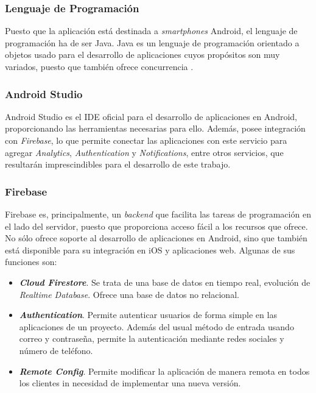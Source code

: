\subsubsection*{Lenguaje de Programación}
Puesto que la aplicación está destinada a \textit{smartphones} Android, el lenguaje de programación ha de ser Java. Java es un lenguaje de programación orientado a objetos usado para el desarrollo de aplicaciones cuyos propósitos son muy variados, puesto que también ofrece concurrencia \cite{Java}.

\subsubsection*{Android Studio}
Android Studio \cite{AndroidStudio} es el \acs{IDE} oficial para el desarrollo de aplicaciones en Android, proporcionando las herramientas necesarias para ello. Además, posee integración con \textit{Firebase}, lo que permite conectar las aplicaciones con este servicio para agregar \textit{Analytics}, \textit{Authentication} y \textit{Notifications}, entre otros servicios, que resultarán imprescindibles para el desarrollo de este trabajo.

\newpage

\subsubsection*{Firebase}
Firebase \cite{GooFirebase} es, principalmente, un \textit{backend} que facilita las tareas de programación en el lado del servidor, puesto que proporciona acceso fácil a los recursos que ofrece. No sólo ofrece soporte al desarrollo de aplicaciones en Android, sino que también está disponible para su integración en iOS y aplicaciones web. Algunas de sus funciones son:

\begin{itemize}
	\item \textbf{\textit{Cloud Firestore}}. Se trata de una base de datos en tiempo real, evolución de \textit{Realtime Database}. Ofrece una base de datos no relacional.
	\item \textbf{\textit{Authentication}}. Permite autenticar usuarios de forma simple en las aplicaciones de un proyecto. Además del usual método de entrada usando correo y contraseña, permite la autenticación mediante redes sociales y número de teléfono.
	\item \textbf{\textit{Remote Config}}. Permite modificar la aplicación de manera remota en todos los clientes in necesidad de implementar una nueva versión.
\end{itemize}


